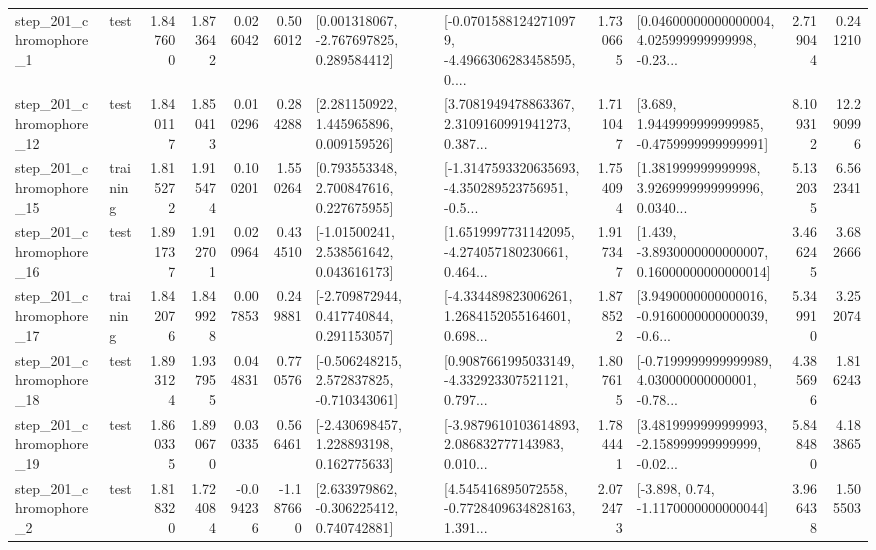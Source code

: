 \begin{tabular}{llrrrrllrlrr}
   step\_201\_chromophore\_1 &      test &      1.847600 &    1.873642 &      0.026042 &  0.506012 &    [0.001318067, -2.767697825, 0.289584412] &  [-0.07015881242710979, -4.4966306283458595, 0.... &       1.730665 &  [0.04600000000000004, 4.025999999999998, -0.23... &            2.719044 &          0.241210 \\
  step\_201\_chromophore\_12 &      test &      1.840117 &    1.850413 &      0.010296 &  0.284288 &     [2.281150922, 1.445965896, 0.009159526] &  [3.7081949478863367, 2.3109160991941273, 0.387... &       1.711047 &   [3.689, 1.9449999999999985, -0.4759999999999991] &            8.109312 &         12.290996 \\
  step\_201\_chromophore\_15 &  training &      1.815272 &    1.915474 &      0.100201 &  1.550264 &     [0.793553348, 2.700847616, 0.227675955] &  [-1.3147593320635693, -4.350289523756951, -0.5... &       1.754094 &  [1.381999999999998, 3.9269999999999996, 0.0340... &            5.132035 &          6.562341 \\
  step\_201\_chromophore\_16 &      test &      1.891737 &    1.912701 &      0.020964 &  0.434510 &     [-1.01500241, 2.538561642, 0.043616173] &  [1.6519997731142095, -4.274057180230661, 0.464... &       1.917347 &  [1.439, -3.8930000000000007, 0.16000000000000014] &            3.466245 &          3.682666 \\
  step\_201\_chromophore\_17 &  training &      1.842076 &    1.849928 &      0.007853 &  0.249881 &    [-2.709872944, 0.417740844, 0.291153057] &  [-4.334489823006261, 1.2684152055164601, 0.698... &       1.878522 &  [3.9490000000000016, -0.9160000000000039, -0.6... &            5.349910 &          3.252074 \\
  step\_201\_chromophore\_18 &      test &      1.893124 &    1.937955 &      0.044831 &  0.770576 &   [-0.506248215, 2.572837825, -0.710343061] &  [0.9087661995033149, -4.332923307521121, 0.797... &       1.807615 &  [-0.7199999999999989, 4.030000000000001, -0.78... &            4.385696 &          1.816243 \\
  step\_201\_chromophore\_19 &      test &      1.860335 &    1.890670 &      0.030335 &  0.566461 &    [-2.430698457, 1.228893198, 0.162775633] &  [-3.9879610103614893, 2.086832777143983, 0.010... &       1.784441 &  [3.4819999999999993, -2.158999999999999, -0.02... &            5.848480 &          4.183865 \\
   step\_201\_chromophore\_2 &      test &      1.818320 &    1.724084 &     -0.094236 & -1.187660 &    [2.633979862, -0.306225412, 0.740742881] &  [4.545416895072558, -0.7728409634828163, 1.391... &       2.072473 &                [-3.898, 0.74, -1.1170000000000044] &            3.966438 &          1.505503 \\

\end{tabular}
